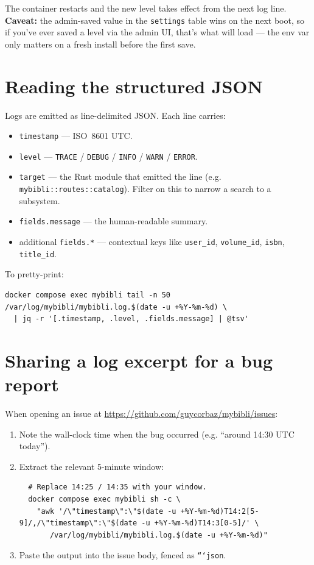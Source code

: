 The container restarts and the new level takes effect from the next
log line. \textbf{Caveat:} the admin-saved value in the
\texttt{settings} table wins on the next boot, so if you've ever
saved a level via the admin UI, that's what will load \string—
the env var only matters on a fresh install before the first save.

\section{Reading the structured JSON}

Logs are emitted as line-delimited JSON. Each line carries:

\begin{itemize}
  \item \texttt{timestamp} — ISO~8601 UTC.
  \item \texttt{level} — \texttt{TRACE} / \texttt{DEBUG} /
        \texttt{INFO} / \texttt{WARN} / \texttt{ERROR}.
  \item \texttt{target} — the Rust module that emitted the line
        (e.g. \texttt{mybibli::routes::catalog}). Filter on this to
        narrow a search to a subsystem.
  \item \texttt{fields.message} — the human-readable summary.
  \item additional \texttt{fields.*} — contextual keys like
        \texttt{user\_id}, \texttt{volume\_id}, \texttt{isbn},
        \texttt{title\_id}.
\end{itemize}

To pretty-print:

\begin{lstlisting}
docker compose exec mybibli tail -n 50 /var/log/mybibli/mybibli.log.$(date -u +%Y-%m-%d) \
  | jq -r '[.timestamp, .level, .fields.message] | @tsv'
\end{lstlisting}

\section{Sharing a log excerpt for a bug report}

When opening an issue at \url{https://github.com/guycorbaz/mybibli/issues}:

\begin{enumerate}
  \item Note the wall-clock time when the bug occurred (e.g.
        ``around 14:30 UTC today'').
  \item Extract the relevant 5-minute window:
  \begin{lstlisting}
  # Replace 14:25 / 14:35 with your window.
  docker compose exec mybibli sh -c \
    "awk '/\"timestamp\":\"$(date -u +%Y-%m-%d)T14:2[5-9]/,/\"timestamp\":\"$(date -u +%Y-%m-%d)T14:3[0-5]/' \
       /var/log/mybibli/mybibli.log.$(date -u +%Y-%m-%d)"
  \end{lstlisting}
  \item Paste the output into the issue body, fenced as
        \texttt{```json}.
\end{enumerate}

